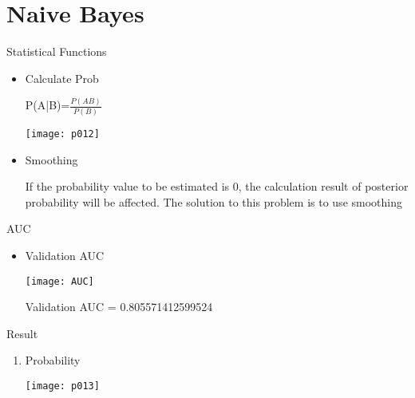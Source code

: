 \documentclass[
 size=12pt,
 paper=smartboard, %
 mode=present, %
 display=slides, %
style=tuliplab,
pauseslide,
fleqn,leqno]{powerdot}
\begin{document}
\section{Naive Bayes}


\begin{slide}{Statistical Functions}
\begin{itemize}
\item Calculate Prob
\par
P(A|B)=$\frac{P(AB)}{P(B)}$
\par
\texttt{[image: p012]}
\item Smoothing
\par
If the probability value to be estimated is 0, the calculation result of posterior probability will be affected. The solution to this problem is to use smoothing
\par

\end{itemize}
\end{slide}


\begin{slide}{AUC }
\begin{itemize}
\item Validation AUC
\par
\texttt{[image: AUC]}
\par
Validation AUC = 0.805571412599524
\par
\end{itemize}
\end{slide}


\begin{slide}{Result}
\begin{enumerate}[type=1]%
\item Probability
\par
\texttt{[image: p013]}
\end{enumerate}
\end{slide}
\end{document}
